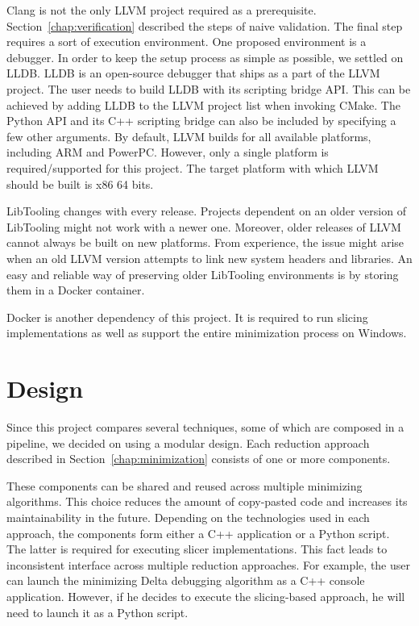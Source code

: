 Clang is not the only LLVM project required as a prerequisite.
Section~\ref{chap:verification} described the steps of naive validation. 
The final step requires a sort of execution environment. 
One proposed environment is a debugger. 
In order to keep the setup process as simple as possible, we settled on LLDB. 
LLDB is an open-source debugger that ships as a part of the LLVM project.
The user needs to build LLDB with its scripting bridge API.
This can be achieved by adding LLDB to the LLVM project list when invoking 
CMake.
The Python API and its C++ scripting bridge can also be included by 
specifying a few other arguments.
By default, LLVM builds for all available platforms, including ARM and 
PowerPC.
However, only a single platform is required/supported for this project.
The target platform with which LLVM should be built is x86 64 bits.

LibTooling changes with every release.
Projects dependent on an older version of LibTooling might not work with 
a newer one.
Moreover, older releases of LLVM cannot always be built on new platforms.
From experience, the issue might arise when an old LLVM version attempts 
to link new system headers and libraries.
An easy and reliable way of preserving older LibTooling environments is by 
storing them in a Docker container.

Docker is another dependency of this project.
It is required to run slicing implementations as well as support the entire 
minimization process on Windows.

\section{Design}

Since this project compares several techniques, some of which are composed in 
a pipeline, we decided on using a modular design. 
Each reduction approach described in Section~\ref{chap:minimization} consists 
of one or more components. 

These components can be shared and reused across multiple minimizing 
algorithms. 
This choice reduces the amount of copy-pasted code and increases its 
maintainability in the future. 
Depending on the technologies used in each app\-roach, the components form 
either a C++ application or a Python script. 
The latter is required for executing slicer implementations. 
This fact leads to inconsistent interface across multiple reduction 
approaches. 
For example, the user can launch the minimizing Delta debugging algorithm as 
a C++ console application. 
However, if he decides to execute the slicing-based approach, he will need 
to launch it as a Python script.

